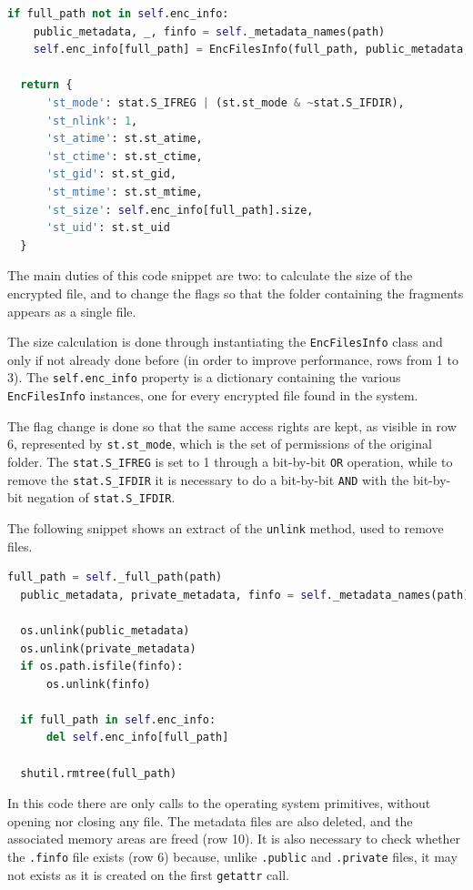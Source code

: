\documentclass[a4paper,12pt,twoside,openright]{report}
\begin{document}
  \begin{lstlisting}[language=Python]
  if full_path not in self.enc_info:
    public_metadata, _, finfo = self._metadata_names(path)
    self.enc_info[full_path] = EncFilesInfo(full_path, public_metadata, finfo)

  return {
      'st_mode': stat.S_IFREG | (st.st_mode & ~stat.S_IFDIR),
      'st_nlink': 1,
      'st_atime': st.st_atime,
      'st_ctime': st.st_ctime,
      'st_gid': st.st_gid,
      'st_mtime': st.st_mtime,
      'st_size': self.enc_info[full_path].size,
      'st_uid': st.st_uid
  }
  \end{lstlisting}

  The main duties of this code snippet are two: to calculate the size of the encrypted file, and to
  change the flags so that the folder containing the fragments appears as a single file.

  The size calculation is done through instantiating the \texttt{EncFilesInfo} class and
  only if not already done before (in order to improve performance, rows from 1 to 3).
  The \texttt{self.enc\_info} property is a dictionary containing the various \texttt{EncFilesInfo} instances,
  one for every encrypted file found in the system.
  
  The flag change is done so that the same access rights are kept, as visible in row 6,
  represented by \texttt{st.st\_mode}, which is the set of permissions of the original folder.
  The \texttt{stat.S\_IFREG} is set to 1 through a bit-by-bit \texttt{OR} operation, while to remove
  the \texttt{stat.S\_IFDIR} it is necessary to do a bit-by-bit \texttt{AND} with the bit-by-bit negation
  of \texttt{stat.S\_IFDIR}.

  The following snippet shows an extract of the \texttt{unlink} method, used to remove files.

  \clearpage
  \begin{lstlisting}[language=Python]
  full_path = self._full_path(path)
  public_metadata, private_metadata, finfo = self._metadata_names(path)

  os.unlink(public_metadata)
  os.unlink(private_metadata)
  if os.path.isfile(finfo):
      os.unlink(finfo)

  if full_path in self.enc_info:
      del self.enc_info[full_path]

  shutil.rmtree(full_path)
  \end{lstlisting}

  In this code there are only calls to the operating system primitives, without opening nor closing any file.
  The metadata files are also deleted, and the associated memory areas are freed (row 10).
  It is also necessary to check whether the \texttt{.finfo} file exists (row 6) because, unlike \texttt{.public}
  and \texttt{.private} files, it may not exists as it is created on the first \texttt{getattr} call.
\end{document}

